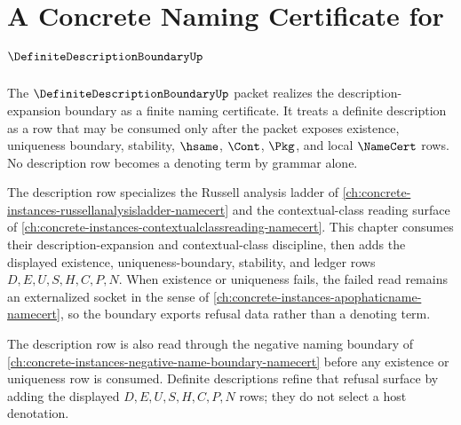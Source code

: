 \chapter{A Concrete Naming Certificate for $\DefiniteDescriptionBoundaryUp$}
\label{ch:concrete-instances-definite-description-boundary-namecert}

The $\DefiniteDescriptionBoundaryUp$ packet realizes the description-expansion boundary as a finite naming certificate. It treats a definite description as a row that may be consumed only after the packet exposes existence, uniqueness boundary, stability, $\hsame$, $\Cont$, $\Pkg$, and local $\NameCert$ rows. No description row becomes a denoting term by grammar alone.

The description row specializes the Russell analysis ladder of \autoref{ch:concrete-instances-russellanalysisladder-namecert} and the contextual-class reading surface of \autoref{ch:concrete-instances-contextualclassreading-namecert}. This chapter consumes their description-expansion and contextual-class discipline, then adds the displayed existence, uniqueness-boundary, stability, and ledger rows $D,E,U,S,H,C,P,N$. When existence or uniqueness fails, the failed read remains an externalized socket in the sense of \autoref{ch:concrete-instances-apophaticname-namecert}, so the boundary exports refusal data rather than a denoting term.

The description row is also read through the negative naming boundary of \autoref{ch:concrete-instances-negative-name-boundary-namecert} before any existence or uniqueness row is consumed. Definite descriptions refine that refusal surface by adding the displayed $D,E,U,S,H,C,P,N$ rows; they do not select a host denotation.

